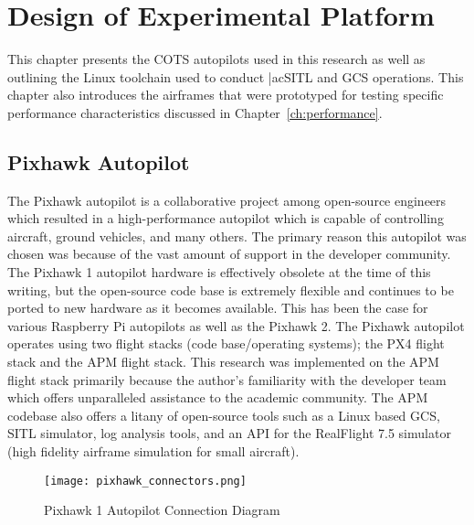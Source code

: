 \chapter{Design of Experimental Platform}\label{ch:platform}

This chapter presents the \ac{COTS} autopilots used in this research as well as outlining the Linux toolchain used to conduct |ac{SITL} and \ac{GCS} operations.  This chapter also introduces the airframes that were prototyped for testing specific performance characteristics discussed in Chapter~\ref{ch:performance}.

\section{Pixhawk Autopilot}
The Pixhawk autopilot is a collaborative project among open-source engineers which resulted in a high-performance autopilot which is capable of controlling aircraft, ground vehicles, and many others.  The primary reason this autopilot was chosen was because of the vast amount of support in the developer community.  The Pixhawk 1 autopilot hardware is effectively obsolete at the time of this writing, but the open-source code base is extremely flexible and continues to be ported to new hardware as it becomes available.  This has been the case for various Raspberry Pi autopilots as well as the Pixhawk 2.  The Pixhawk autopilot operates using two flight stacks (code base/operating systems); the PX4 flight stack and the \ac{APM} flight stack.  This research was implemented on the \ac{APM} flight stack primarily because the author's familiarity with the developer team which offers unparalleled assistance to the academic community.  The \ac{APM} codebase also offers a litany of open-source tools such as a Linux based \ac{GCS}, \ac{SITL} simulator, log analysis tools, and an \ac{API} for the RealFlight 7.5 simulator (high fidelity airframe simulation for small aircraft).

\begin{figure}[h!]
 \centering
  \texttt{[image: pixhawk\_connectors.png]}
  \caption{Pixhawk 1 Autopilot Connection Diagram  \cite{apm_org}}
  \label{fig:pixhawk_autopilot}
\end{figure}

